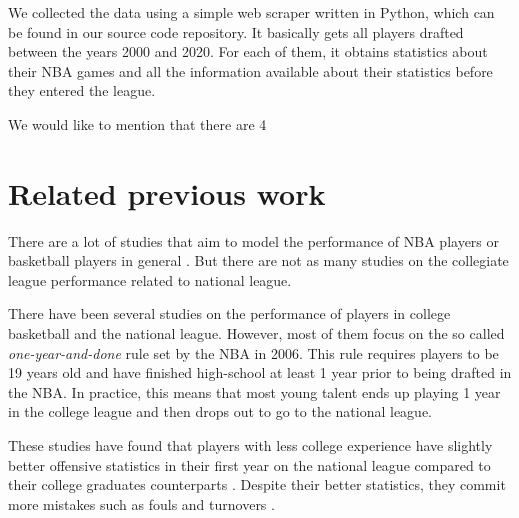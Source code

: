 We collected the data using a simple web scraper written in Python, which can be
found in our source code repository. It basically gets all players drafted between the years 2000 and 2020. For each of them, it obtains statistics about their NBA games and all the information available about their statistics before they entered the league.

We would like to mention that there are 4 

\section{Related previous work}%
\label{sec:previous-work}

There are a lot of studies that aim to model the performance of NBA players
or basketball players in general \cite{terner_modeling_2020,
casals_modelling_2013, kokanauskas_modelling_2021}.  But there are not as many
studies on the collegiate league performance related to national league.

There have been several studies on the performance of players in college
basketball and the national league. However, most of them focus on the so called
\emph{one-year-and-done} rule \cite{noauthor_nba_2006} set by the NBA in 2006.
This rule requires players to be 19 years old and have finished high-school at least
1 year prior to being drafted in the NBA. In practice, this means that most
young talent ends up playing 1 year in the college league and then drops out to
go to the national league.

These studies have found that players with less college experience have slightly
better offensive statistics in their first year on the national league compared to their
college graduates counterparts \cite{ashley_explaining_2017}. Despite their better statistics,
they commit more mistakes such as fouls and turnovers \cite{zestcott_one_2020}.

